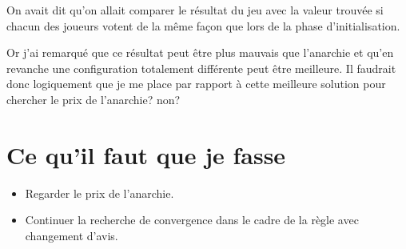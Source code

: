 \documentclass[12pt]{article}
\theoremstyle{defi}
\theoremstyle{not}
\theoremstyle{prob}
\begin{document}
    On avait dit qu'on allait comparer le résultat du jeu avec la valeur trouvée si chacun des joueurs votent de la même façon que lors de la phase d'initialisation.

    Or j'ai remarqué que ce résultat peut être plus mauvais que l'anarchie et qu'en revanche une configuration totalement différente peut être meilleure. Il faudrait donc logiquement que je me place par rapport à cette meilleure solution pour chercher le prix de l'anarchie? non?\\

  \section{Ce qu'il faut que je fasse}

    \begin{itemize}
      \item Regarder le prix de l'anarchie.
      \item Continuer la recherche de convergence dans le cadre de la règle avec changement d'avis.
    \end{itemize}
\end{document}

